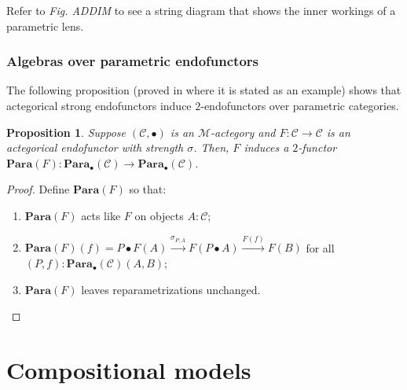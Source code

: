 \documentclass[12pt,a4paper,openright,twoside]{report}
\theoremstyle{plain}
\newtheorem{proposition}{Proposition}
\theoremstyle{definition}
\begin{document}
Refer to \textit{Fig. ADDIM} to see a string diagram that shows the inner workings of a parametric lens.

\subsubsection{Algebras over parametric endofunctors}

The following proposition (proved in \cite{gavranovicposition} where it is stated as an example) shows that actegorical strong endofunctors induce $2$-endofunctors over parametric categories.

\begin{proposition}
  \label{prop: paraend}
  Suppose $(\mathcal{C}, \bullet)$ is an $\mathcal{M}$-actegory and $F: \mathcal{C} \to \mathcal{C}$ is an actegorical endofunctor with strength $\sigma$. Then, $F$ induces a  $2$-functor $\mathbf{Para}(F): \mathbf{Para}_{\bullet}(\mathcal{C}) \to \mathbf{Para}_{\bullet}(\mathcal{C})$.
\end{proposition}
\begin{proof}
  Define $\mathbf{Para}(F)$ so that: 
  \begin{enumerate}
    \item $\mathbf{Para}(F)$ acts like $F$ on objects $A: \mathcal{C}$;
    \item $\mathbf{Para}(F)(f) = P \bullet F(A) \stackrel{\sigma_{P,A}}{\longrightarrow} F(P \bullet A) \stackrel{F(f)}{\longrightarrow} F(B)$ for all $(P,f):\mathbf{Para}_{\bullet}(\mathcal{C})(A,B)$;
    \item $\mathbf{Para}(F)$ leaves reparametrizations unchanged.
  \end{enumerate}
\end{proof}







\section{Compositional models}
\end{document}
